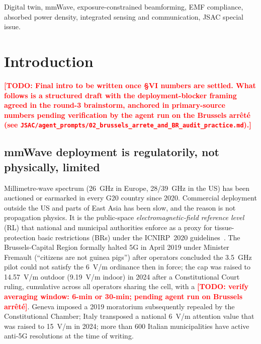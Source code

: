 \documentclass[journal,twoside,onecolumn]{IEEEtran}
\theoremstyle{definition}
\newcommand{\TODO}[1]{\textcolor{red}{\textbf{[TODO: #1]}}}
\begin{document}
\begin{IEEEkeywords}
Digital twin, mmWave, exposure-constrained beamforming, EMF
compliance, absorbed power density, integrated sensing and
communication, JSAC special issue.
\end{IEEEkeywords}

\section{Introduction}\label{sec:intro}

\TODO{Final intro to be written once §VI numbers are settled. What
follows is a structured draft with the deployment-blocker framing
agreed in the round-3 brainstorm, anchored in primary-source
numbers pending verification by the agent run on the Brussels
arrêté (see \texttt{JSAC/agent\_prompts/02\_brussels\_arrete\_and\_BR\_audit\_practice.md}).}

\subsection{mmWave deployment is regulatorily, not physically, limited}

Millimetre-wave spectrum (26~GHz in Europe, 28/39~GHz in the US)
has been auctioned or earmarked in every G20 country since 2020.
Commercial deployment outside the US and parts of East Asia has
been slow, and the reason is not propagation physics. It is the
public-space \emph{electromagnetic-field reference level} (RL) that
national and municipal authorities enforce as a proxy for
tissue-protection basic restrictions (BRs) under the ICNIRP~2020
guidelines~\cite{ICNIRP2020}. The Brussels-Capital Region formally
halted 5G in April 2019 under Minister Fremault (``citizens are
not guinea pigs'') after operators concluded the 3.5~GHz pilot
could not satisfy the 6~V/m ordinance then in force; the cap was
raised to 14.57~V/m outdoor (9.19~V/m indoor) in 2024 after a
Constitutional Court ruling, cumulative across all operators
sharing the cell, with a \TODO{verify averaging window: 6-min or
30-min; pending agent run on Brussels arrêté}. Geneva imposed a
2019 moratorium subsequently repealed by the Constitutional
Chamber; Italy transposed a national 6~V/m attention value that
was raised to 15~V/m in 2024; more than 600 Italian municipalities
have active anti-5G resolutions at the time of writing.
\end{document}
